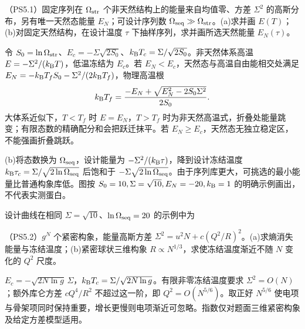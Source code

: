 \begin{exercise}
（PS5.1）固定序列在 $\Omega_{\rm str}$ 个非天然结构上的能量来自均值零、方差 $\Sigma^2$ 的高斯分布，另有唯一天然态能量 $E_N$；可设计序列数 $\Omega_{\rm seq}\gg\Omega_{\rm str}$。(a)求并画 $E(T)$；(b)对固定天然结构，在设计温度 $\tau$ 下抽样序列，求并画所选天然能量 $E_N(\tau)$。
\end{exercise}
\begin{solution}
令 $S_0=\ln\Omega_{\rm str}$、$E_c=-\Sigma\sqrt{2S_0}$、$k_{\mathrm B} T_c=\Sigma/\sqrt{2S_0}$。非天然体系高温 $E=-\Sigma^2/(k_{\mathrm B} T)$，低温冻结为 $E_c$。若 $E_N<E_c$，天然态与高温自由能相交处满足 $E_N=-k_{\mathrm B} T_f S_0-\Sigma^2/(2k_{\mathrm B} T_f)$，物理高温根
\[
k_{\mathrm B} T_f=\frac{-E_N+\sqrt{E_N^2-2S_0\Sigma^2}}{2S_0}.
\]
大体系近似下，$T<T_f$ 时 $E=E_N$，$T>T_f$ 时为非天然高温式，折叠处能量跳变；有限态数的精确配分和会把跃迁抹平。若 $E_N\ge E_c$，天然态无独立稳定区，不能强画折叠跳跃。

(b)将态数换为 $\Omega_{\rm seq}$，设计能量为 $-\Sigma^2/(k_{\mathrm B}\tau)$，降到设计冻结温度 $k_{\mathrm B}\tau_c=\Sigma/\sqrt{2\ln\Omega_{\rm seq}}$ 后饱和于 $-\Sigma\sqrt{2\ln\Omega_{\rm seq}}$。由于序列库更大，可挑选的最小能量比普通构象库低。图按 $S_0=10,\Sigma=\sqrt{10},E_N=-20,k_{\mathrm B}=1$ 的明确示例画出，不代表实测蛋白。
\begin{center}\end{center}
设计曲线在相同 $\Sigma=\sqrt{10}$、$\ln\Omega_{\rm seq}=20$ 的示例中为
\begin{center}\end{center}
\end{solution}

\begin{exercise}
（PS5.2）$g^N$ 个紧密构象，能量高斯方差 $\Sigma^2=u^2N+c(Q^2/R)^2$。(a)求熵消失能量与冻结温度；(b)紧密球状三维构象 $R\propto N^{1/3}$，求使冻结温度渐近不随 $N$ 变化的 $Q^2$ 尺度。
\end{exercise}
\begin{solution}
$E_c=-\sqrt{2N\ln g}\,\Sigma$，$k_{\mathrm B} T_c=\Sigma/\sqrt{2N\ln g}$。有限非零冻结温度要求 $\Sigma^2=O(N)$；额外库仑方差 $cQ^4/R^2$ 不超过这一阶，即 $Q^2=O(N^{5/6})$。取正好 $N^{5/6}$ 使电项与骨架项同时保持重要，增长更慢则电项渐近可忽略。指数仅对题面三维紧密构象及给定方差模型适用。
\end{solution}

